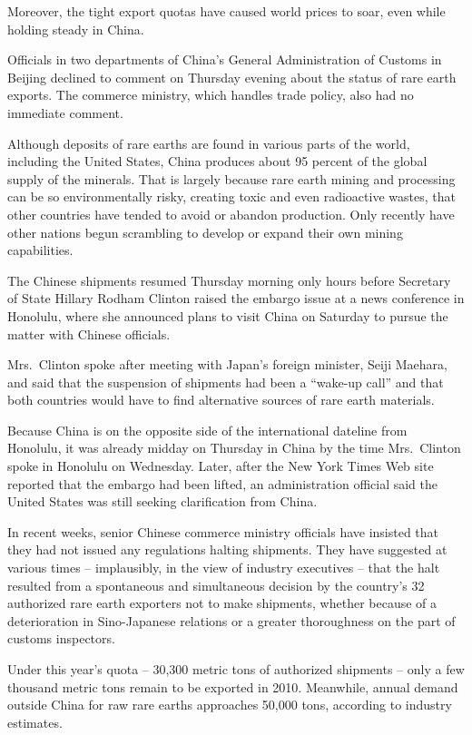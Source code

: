 ﻿\documentclass[12pt]{article}
\begin{document}
Moreover, the tight export quotas have caused world prices to soar, even while holding steady in
China.

Officials in two departments of China's General Administration of Customs in Beijing declined to
comment on Thursday evening about the status of rare earth exports. The commerce ministry, which
handles trade policy, also had no immediate comment.

Although deposits of rare earths are found in various parts of the world, including the United
States, China produces about 95 percent of the global supply of the minerals. That is largely
because rare earth mining and processing can be so environmentally risky, creating toxic and even
radioactive wastes, that other countries have tended to avoid or abandon production. Only recently
have other nations begun scrambling to develop or expand their own mining capabilities.

The Chinese shipments resumed Thursday morning only hours before Secretary of State Hillary Rodham
Clinton raised the embargo issue at a news conference in Honolulu, where she announced plans to
visit China on Saturday to pursue the matter with Chinese officials.

Mrs.~Clinton spoke after meeting with Japan's foreign minister, Seiji Maehara, and said that the
suspension of shipments had been a ``wake-up call'' and that both countries would have to find
alternative sources of rare earth materials.

Because China is on the opposite side of the international dateline from Honolulu, it was already
midday on Thursday in China by the time Mrs.~Clinton spoke in Honolulu on Wednesday. Later, after
the New York Times Web site reported that the embargo had been lifted, an administration official
said the United States was still seeking clarification from China.

In recent weeks, senior Chinese commerce ministry officials have insisted that they had not issued
any regulations halting shipments. They have suggested at various times -- implausibly, in the view
of industry executives -- that the halt resulted from a spontaneous and simultaneous decision by the
country's 32 authorized rare earth exporters not to make shipments, whether because of a
deterioration in Sino-Japanese relations or a greater thoroughness on the part of customs
inspectors.

Under this year's quota -- 30,300 metric tons of authorized shipments -- only a few thousand metric
tons remain to be exported in 2010. Meanwhile, annual demand outside China for raw rare earths
approaches 50,000 tons, according to industry estimates.
\end{document}

